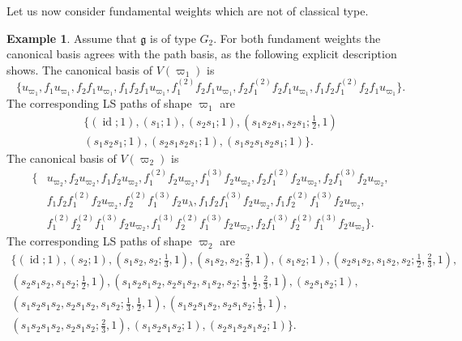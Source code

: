 \documentclass[final]{amsart}
\theoremstyle{plain}
\theoremstyle{definition}
\newtheorem{example}[corollary]{Example}
\newcommand{\frakg}{\mathfrak g}
\DeclareMathOperator{\id}{id}
\begin{document}
Let us now consider fundamental weights which are not of classical type.

\begin{example}
    \label{example:g2-fundamental-weights}
    Assume that $\frakg$ is of type $G_2$.
    For both fundament weights the canonical basis agrees with the path basis, as the following explicit description shows.
    The canonical basis of $V({\varpi_1})$ is
    \[
        \{ u_{\varpi_1}, f_1 u_{\varpi_1}, f_2 f_1 u_{\varpi_1}, f_1 f_2 f_1 u_{\varpi_1}, f_1^{(2)} f_2 f_1 u_{\varpi_1}, f_2 f_1^{(2)} f_2 f_1 u_{\varpi_1}, f_1 f_2 f_1^{(2)} f_2 f_1 u_{\varpi_1} \}.
    \]
    The corresponding LS paths of shape $\varpi_1$ are
    \begin{align*}
        \{ (\id; 1), (s_1; 1), (s_2s_1; 1), (s_1s_2s_1, s_2s_1; \tfrac12, 1) \\
        (s_1s_2s_1; 1), (s_2s_1s_2s_1; 1), (s_1s_2s_1s_2s_1; 1) \}.
    \end{align*}
    The canonical basis of $V({\varpi_2})$ is
    \begin{align*}
        \{ & u_{\varpi_2}, f_2 u_{\varpi_2}, f_1 f_2 u_{\varpi_2}, f_1^{(2)} f_2 u_{\varpi_2}, f_1^{(3)} f_2 u_{\varpi_2}, f_2 f_1^{(2)} f_2 u_{\varpi_2}, f_2 f_1^{(3)} f_2 u_{\varpi_2}, \\
        & f_1 f_2 f_1^{(2)} f_2 u_{\varpi_2}, f_2^{(2)} f_1^{(3)} f_2 u_\lambda, f_1 f_2 f_1^{(3)} f_2 u_{\varpi_2}, f_1 f_2^{(2)} f_1^{(3)} f_2 u_{\varpi_2}, \\
        & f_1^{(2)} f_2^{(2)} f_1^{(3)} f_2 u_{\varpi_2}, f_1^{(3)} f_2^{(2)} f_1^{(3)} f_2 u_{\varpi_2}, f_2 f_1^{(3)} f_2^{(2)} f_1^{(3)} f_2 u_{\varpi_2} \}.
    \end{align*}
    The corresponding LS paths of shape $\varpi_2$ are
    \begin{align*}
        \{ (\id; 1), (s_2; 1), (s_1s_2, s_2; \tfrac13, 1), (s_1s_2, s_2; \tfrac23, 1), (s_1s_2; 1), (s_2s_1s_2, s_1s_2, s_2; \tfrac12, \tfrac23, 1), \\
        (s_2s_1s_2, s_1s_2; \tfrac12, 1), (s_1s_2s_1s_2, s_2s_1s_2, s_1s_2, s_2; \tfrac13, \tfrac12, \tfrac23, 1), (s_2s_1s_2; 1), \\
        (s_1s_2s_1s_2, s_2s_1s_2, s_1s_2; \tfrac13, \tfrac12, 1), (s_1s_2s_1s_2, s_2s_1s_2; \tfrac13, 1), \\
        (s_1s_2s_1s_2, s_2s_1s_2; \tfrac23, 1), (s_1s_2s_1s_2; 1), (s_2s_1s_2s_1s_2; 1) \}.
    \end{align*}
\end{example}
\end{document}
